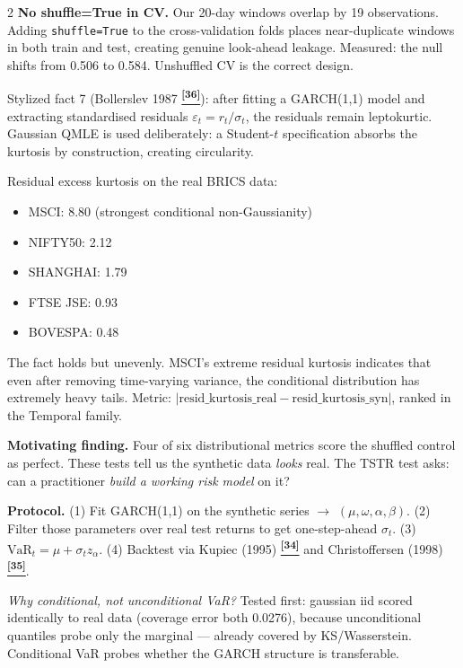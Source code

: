 \documentclass[10pt]{article}
\newcommand{\navybox}[2]{\begin{tcolorbox}[mybox={Navy}{LBg},title={#1}]#2\end{tcolorbox}}
\newcommand{\purplebox}[2]{\begin{tcolorbox}[mybox={Purple}{LBg},title={#1}]#2\end{tcolorbox}}
\newcommand{\tcite}[1]{%
  \hyperlink{R:#1}{\textsuperscript{\scriptsize\textbf{[#1]}}}}
\begin{document}
\begin{multicols}{2}
{\medskip
\textbf{No shuffle=True in CV.} Our 20-day windows overlap by 19 observations. Adding \texttt{shuffle=True} to the cross-validation folds places near-duplicate windows in both train and test, creating genuine look-ahead leakage. Measured: the null shifts from 0.506 to 0.584. Unshuffled CV is the correct design.}

\columnbreak

\purplebox{Conditional Heavy Tails}{%
Stylized fact 7 (Bollerslev 1987\tcite{36}): after fitting a GARCH(1,1) model and extracting standardised residuals $\varepsilon_t = r_t / \sigma_t$, the residuals remain leptokurtic. Gaussian QMLE is used deliberately: a Student-$t$ specification absorbs the kurtosis by construction, creating circularity.

Residual excess kurtosis on the real BRICS data:
\begin{itemize}[noitemsep,topsep=1pt]
  \item MSCI: 8.80 (strongest conditional non-Gaussianity)
  \item NIFTY50: 2.12
  \item SHANGHAI: 1.79
  \item FTSE JSE: 0.93
  \item BOVESPA: 0.48
\end{itemize}

The fact holds but unevenly. MSCI's extreme residual kurtosis indicates that even after removing time-varying variance, the conditional distribution has extremely heavy tails. Metric: $|\text{resid\_kurtosis\_real} - \text{resid\_kurtosis\_syn}|$, ranked in the Temporal family.}

\navybox{Downstream Utility: TSTR Protocol}{%
\textbf{Motivating finding.} Four of six distributional metrics score the shuffled control as perfect. These tests tell us the synthetic data \emph{looks} real. The TSTR test asks: can a practitioner \emph{build a working risk model} on it?

\textbf{Protocol.} (1) Fit GARCH(1,1) on the synthetic series $\to$ $(\mu, \omega, \alpha, \beta)$. (2) Filter those parameters over real test returns to get one-step-ahead $\sigma_t$. (3) $\text{VaR}_t = \mu + \sigma_t z_\alpha$. (4) Backtest via Kupiec (1995)\tcite{34} and Christoffersen (1998)\tcite{35}.

\textit{Why conditional, not unconditional VaR?} Tested first: gaussian iid scored identically to real data (coverage error both 0.0276), because unconditional quantiles probe only the marginal --- already covered by KS/Wasserstein. Conditional VaR probes whether the GARCH structure is transferable.

}
\end{multicols}
\end{document}
